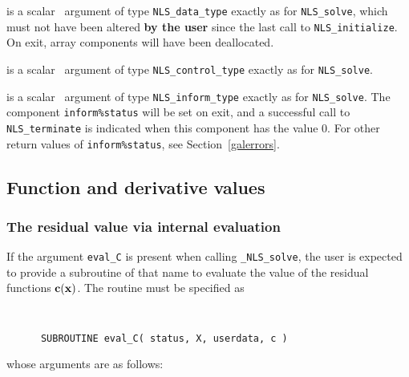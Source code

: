 \documentclass{galahad}
\newcommand{\packagename}{NLS}
\newcommand{\fullpackagename}{\libraryname\_\packagename}
\newcommand{\solver}{{\tt \fullpackagename\_solve}}
\begin{document}
\vspace*{-1mm}
\begin{description}

 is a scalar \intentinout\ argument of type
{\tt \packagename\_data\_type}
exactly as for
{\tt \packagename\_solve},
which must not have been altered {\bf by the user} since the last call to
{\tt \packagename\_initialize}.
On exit, array components will have been deallocated.

 is a scalar \intentin\ argument of type
{\tt \packagename\_control\_type}
exactly as for
{\tt \packagename\_solve}.

 is a scalar \intentout\ argument of type
{\tt \packagename\_inform\_type}
exactly as for
{\tt \packagename\_solve}.
The component {\tt inform\%status} will be set on exit, and a
successful call to
{\tt \packagename\_terminate}
is indicated when this  component has the value 0.
For other return values of {\tt inform\%status}, see Section~\ref{galerrors}.

\end{description}


\subsection{Function and derivative values\label{fdv}}


\subsubsection{The residual value via internal evaluation\label{rfv}}

If the argument {\tt eval\_C} is present when calling \solver, the
user is expected to provide a subroutine of that name to evaluate the
value of the residual functions ${\mathbf{c}}({\mathbf{x}})$.
The routine must be specified as

\def\baselinestretch{0.8}
{\tt
\begin{verbatim}
      SUBROUTINE eval_C( status, X, userdata, c )
\end{verbatim}
}
\def\baselinestretch{1.0}
\noindent whose arguments are as follows:
\end{document}
